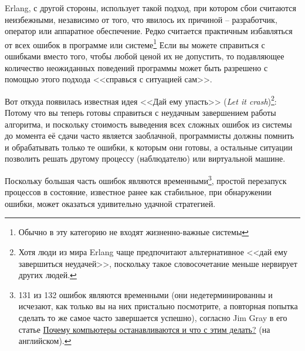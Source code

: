 \documentclass[11pt, oneside]{book}   	%
\begin{document}
Erlang, с другой стороны, использует такой подход, при котором сбои считаются неизбежными, независимо от того, что явилось их причиной -- разработчик, оператор или аппаратное обеспечение. Редко считается практичным избавляться от всех ошибок в программе или системе\footnote{Обычно в эту категорию не входят жизненно-важные системы} Если вы можете справиться с ошибками вместо того, чтобы любой ценой их не допустить, то подавляющее количество неожиданных поведений программы может быть разрешено с помощью этого подхода <<справься с ситуацией сам>>.

Вот откуда появилась известная идея <<Дай ему упасть>> (\emph{Let it crash})\footnote{Хотя люди из мира Erlang чаще предпочитают альтернативное <<дай ему завершиться неудачей>>, поскольку такое словосочетание меньше нервирует других людей.}: Потому что вы теперь готовы справиться с неудачным завершением работы алгоритма, и поскольку стоимость выведения всех сложных ошибок из системы до момента её сдачи часто является заоблачной, программисты должны помнить и обрабатывать только те ошибки, к которым они готовы, а остальные ситуации позволить решать другому процессу (наблюдателю) или виртуальной машине.

Поскольку большая часть ошибок являются временными\footnote{131 из 132 ошибок являются временными (они недетерминированны и исчезают, как только вы на них пристально посмотрите, а повторная попытка сделать то же самое часто завершается успешно), согласно Jim Gray в его статье \href{http://www.hpl.hp.com/techreports/tandem/TR-85.7.html}{Почему компьютеры останавливаются и что с этим делать?} (на английском).}, простой перезапуск процессов в состояние, известное ранее как стабильное, при обнаружении ошибки, может оказаться удивительно удачной стратегией.
\end{document}
